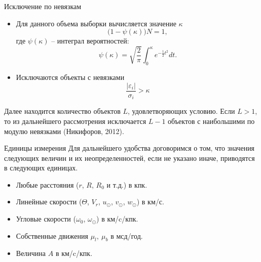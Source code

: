 \documentclass[compress]{beamer}
\begin{document}
\begin{frame}{Исключение по невязкам}
	\begin{itemize}
		\item Для данного объема выборки вычисляется значение $\kappa$
			\begin{equation}
				\big(1 - \psi(\kappa)\big) N = 1,
			\end{equation}
			где $\psi(\kappa)$ -- интеграл вероятностей:
			\begin{equation}
				\psi(\kappa) = \sqrt{\frac{2}{\pi}} \int^{\kappa}_{0} e^{-\frac{1}{2}t^2} dt.
			\end{equation}
		\item Исключаются объекты с невязками
			\begin{equation}
				\frac{| \varepsilon_i |}{\sigma_i} > \kappa
			\end{equation}
	\end{itemize}
        Далее находится количество объектов $L$, удовлетворяющих условию. Если $L > 1$, то из дальнейшего рассмотрения исключается $L - 1$ объектов с наибольшими по модулю невязками (Никифоров, 2012). 
\end{frame}

\begin{frame}{Единицы измерения}
        Для дальнейшего удобства договоримся о том, что значения следующих величин и их неопределенностей, если не указано иначе, приводятся в следующих единицах.
        \begin{itemize}
                \item Любые расстояния ($r$, $R$, $R_0$ и т.д.) в кпк.
                \item Линейные скорости ($\Theta$, $V_r$, $u_{\odot}$, $v_{\odot}$, $w_{\odot}$) в км/с.
                \item Угловые скорости ($\omega_0$, $\omega_{\odot}$) в км/c/кпк.
                \item Собственные движения $\mu_l, ~\mu_b$ в мсд/год.
                \item Величина $A$ в км/c/кпк.
        \end{itemize}
\end{frame}
\end{document}
